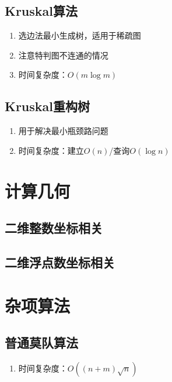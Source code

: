 \documentclass[twocolumn,a4,8pt]{article}  %
\begin{document}
		\subsection{Kruskal算法}
			\noindent\begin{enumerate}
				\item 选边法最小生成树，适用于稀疏图
				\item 注意特判图不连通的情况
				\item 时间复杂度：$O(m\log m)$
			\end{enumerate}
	 	 	
	 	 	
		\subsection{Kruskal重构树}
			\noindent\begin{enumerate}
				\item 用于解决最小瓶颈路问题
				\item 时间复杂度：建立$O(n)$/查询$O(\log n)$
			\end{enumerate}
	 	 	
	 	 	
	\section{计算几何}
		\subsection{二维整数坐标相关}
	 	 	
	 	 	
		\subsection{二维浮点数坐标相关}
	 	 	
	
	\section{杂项算法}
		\subsection{普通莫队算法}
			\noindent\begin{enumerate}
				\item 时间复杂度：$O((n+m)\sqrt{n})$
			\end{enumerate}
	 	 	
	 	 	
\end{document}
